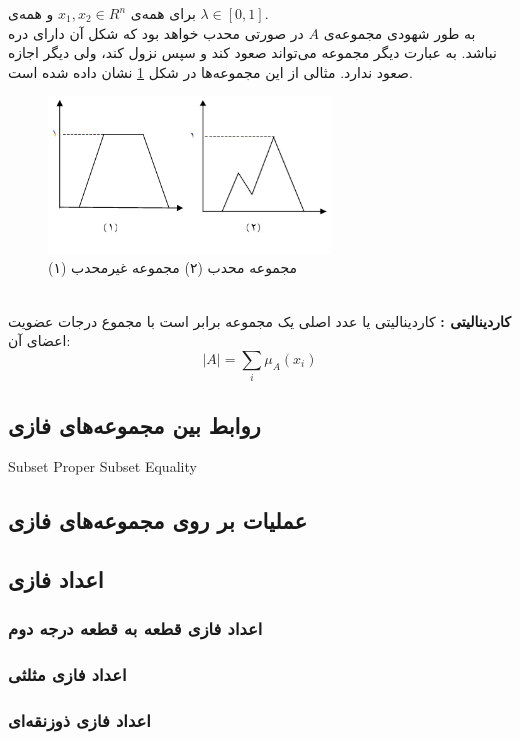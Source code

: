 \documentclass[12pt,a4paper]{article}
\theoremstyle{definition}
\begin{document}
برای همه‌ی
 $x_1,x_2 \in R^n$
 و همه‌ی
 $\lambda \in [0,1]$.\\
 به طور شهودی مجموعه‌ی $A$ در صورتی محدب خواهد بود که شکل آن دارای دره نباشد. به عبارت دیگر مجموعه می‌تواند صعود کند و سپس نزول کند، ولی دیگر اجازه صعود ندارد. مثالی از این مجموعه‌ها در شکل 
 \ref{fig:f_convset}
 نشان داده شده است.
\begin{figure}[h]
	\centering 
	\includegraphics[width=75mm]{Images/Fig7.png}
	\vspace{-1cm}
	\caption{(۱) مجموعه‌ محدب (۲) مجموعه غیرمحدب}\label{fig:f_convset}
\end{figure}\\ 
\textbf{کاردینالیتی :}
کاردینالیتی یا عدد اصلی یک مجموعه برابر است با مجموع درجات عضویت اعضای آن:
\begin{equation}\label{eq:e_cardinality}
	|A|=\sum_{i} \mu_{A}(x_i)
\end{equation}
 \subsection{ روابط بین مجموعه‌های فازی}
Subset
Proper Subset
Equality
 \subsection{عملیات بر روی مجموعه‌های فازی}
 \subsection{‌اعداد فازی}
  \subsubsection{ ‌اعداد فازی قطعه به قطعه درجه دوم}
  \subsubsection{‌اعداد فازی مثلثی}
  \subsubsection{‌اعداد فازی ذوزنقه‌ای}
\end{document}
